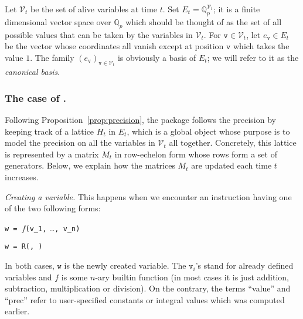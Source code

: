 \documentclass[sigconf]{acmart}
\newcommand{\Q}{\mathbb Q}
\newcommand{\Qp}{\Q_p}
\newcommand{\calV}{\mathcal{V}}
\newcommand{\ttv}{\texttt{v}\xspace}
\newcommand{\ttw}{\texttt{w}\xspace}
\newcommand{\ZpLC}{\text{\color{output} \rm \tt ZpLC}\xspace}
\theoremstyle{definition}
\begin{document}
Let $\calV_t$ be the set of alive variables at time $t$. Set $E_t = 
\Qp^{\calV_t}$; it is a finite dimensional vector space over $\Qp$ which 
should be thought of as the set of all possible values that can be taken by 
the variables in $\calV_t$. For $\ttv \in \calV_t$, let $e_\ttv \in
E_t$ be the vector whose coordinates all vanish except 
at position $\ttv$ which takes the value $1$. The family 
$(e_\ttv)_{\ttv \in \calV_t}$ is obviously a basis of $E_t$; we will 
refer to it as the \emph{canonical basis}.

\subsubsection{The case of \ZpLC.}

Following Proposition~\ref{prop:precision},
the package \ZpLC follows the precision by keeping track of a lattice
$H_t$ in $E_t$, which is a global object whose purpose is to model the 
precision on all the variables in $\calV_t$ all together.
Concretely, this lattice is represented by a matrix $M_t$ in row-echelon 
form whose rows form a set of generators.
Below, we explain how the matrices $M_t$ are updated each time
$t$ increases.

\smallskip

\noindent \textit{Creating a variable.}
%
This happens when we encounter an instruction having one of the
two following forms:

\medskip

\noindent \hspace{5mm} \makebox[2.5cm]{[Computation]\hfill\null}
\verb?w = ?$f$\verb?(v_1,? \ldots\verb?, v_n)?

\smallskip

\noindent \hspace{5mm} 
\verb?w = ?\verb?R(?\verb?, ?\verb?)?

\medskip

\noindent
In both cases, $\ttw$ is the newly created variable. 
The $\ttv_i$'s stand for already defined variables and $f$ is some 
$n$-ary builtin function (in most cases it is just addition, 
subtraction, multiplication or division). On the contrary, the terms 
``value'' and ``prec'' refer to user-specified constants or integral 
values which was computed earlier.

\smallskip
\end{document}
